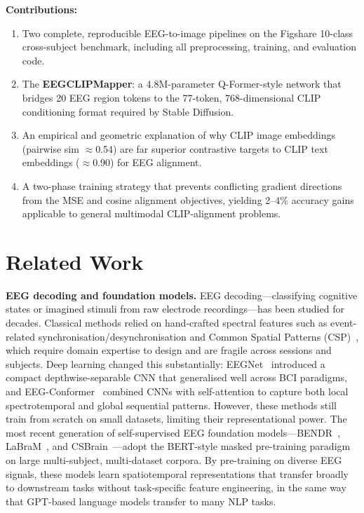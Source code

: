 \documentclass{article}
\begin{document}
\textbf{Contributions:}
\begin{enumerate}[noitemsep,topsep=2pt]
  \item Two complete, reproducible EEG-to-image pipelines on the Figshare 10-class cross-subject benchmark, including all preprocessing, training, and evaluation code.
  \item The \textbf{EEGCLIPMapper}: a 4.8M-parameter Q-Former-style network that bridges 20 EEG region tokens to the 77-token, 768-dimensional CLIP conditioning format required by Stable Diffusion.
  \item An empirical and geometric explanation of why CLIP image embeddings (pairwise sim $\approx$0.54) are far superior contrastive targets to CLIP text embeddings ($\approx$0.90) for EEG alignment.
  \item A two-phase training strategy that prevents conflicting gradient directions from the MSE and cosine alignment objectives, yielding 2--4\% accuracy gains applicable to general multimodal CLIP-alignment problems.
\end{enumerate}

\section{Related Work}

\textbf{EEG decoding and foundation models.}
EEG decoding---classifying cognitive states or imagined stimuli from raw electrode recordings---has been studied for decades. Classical methods relied on hand-crafted spectral features such as event-related synchronisation/desynchronisation and Common Spatial Patterns (CSP)~\citep{blankertz2007bci}, which require domain expertise to design and are fragile across sessions and subjects. Deep learning changed this substantially: EEGNet~\citep{lawhern2018eegnet} introduced a compact depthwise-separable CNN that generalised well across BCI paradigms, and EEG-Conformer~\citep{song2023eegconformer} combined CNNs with self-attention to capture both local spectrotemporal and global sequential patterns. However, these methods still train from scratch on small datasets, limiting their representational power. The most recent generation of self-supervised EEG foundation models---BENDR~\citep{kostas2022bendr}, LaBraM~\citep{jiang2024labram}, and CSBrain~\citep{zhu2024csbrain}---adopt the BERT-style masked pre-training paradigm on large multi-subject, multi-dataset corpora. By pre-training on diverse EEG signals, these models learn spatiotemporal representations that transfer broadly to downstream tasks without task-specific feature engineering, in the same way that GPT-based language models transfer to many NLP tasks.
\end{document}
